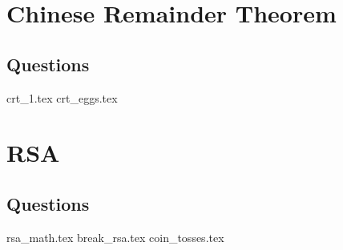 \documentclass{exam}
\begin{document}
\section{Chinese Remainder Theorem}
\subsection{Questions}
\begin{questions}
{crt_1.tex}
{crt_eggs.tex}
\end{questions}

\section{RSA}
\subsection{Questions}
\begin{questions}
{rsa_math.tex}
{break_rsa.tex}
{coin_tosses.tex}
\end{questions}
\end{document}
